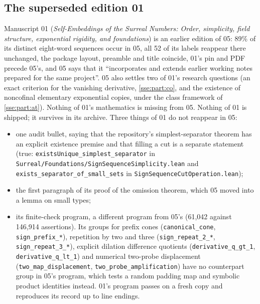 \documentclass[11pt,a4paper]{article}
\numberwithin{equation}{section}
\theoremstyle{plain}
\theoremstyle{definition}
\theoremstyle{remark}
\newcommand{\code}[1]{\texttt{\small #1}}
\newcommand{\fn}[1]{\nolinkurl{#1}}%
\begin{document}
\subsection{The superseded edition 01}
Manuscript 01 (\emph{Self-Embeddings of the Surreal Numbers: Order,
simplicity, field structure, exponential rigidity, and foundations}) is an
earlier edition of 05: 89\% of its distinct eight-word sequences occur in
05, all 52 of its labels reappear there unchanged, the package layout,
preamble and title coincide, 01's pin and PDF precede 05's, and 05 says that
it ``incorporates and extends earlier working notes prepared for the same
project''. 05 also settles two of 01's research questions (an exact
criterion for the vanishing derivative, \cref{sse:part:co}, and the
existence of noncofinal elementary exponential copies, under the class
framework of \cref{sse:part:at}). Nothing of 01's mathematics is missing from
05. Nothing of 01 is shipped; it survives in its archive. Three things of
01 do not reappear in 05:
\begin{itemize}
\item one audit bullet, saying that the repository's simplest-separator
theorem has an explicit existence premise and that filling a cut is a
separate statement (true: \fn{existsUnique_simplest_separator} in
\fn{Surreal/Foundations/SignSequenceSimplicity.lean} and
\fn{exists_separator_of_small_sets} in
\fn{SignSequenceCutOperation.lean});
\item the first paragraph of its proof of the omission theorem, which 05
moved into a lemma on small types;
\item its finite-check program, a different program from 05's
(61,042 against 146,914 assertions). Its groups for prefix cones
(\code{canonical\_cone}, \code{sign\_prefix\_*}), repetition by two and three
(\code{sign\_repeat\_2\_*}, \code{sign\_repeat\_3\_*}), explicit dilation
difference quotients (\code{derivative\_q\_gt\_1}, \code{derivative\_q\_lt\_1})
and numerical two-probe displacement (\code{two\_map\_displacement},
\code{two\_probe\_amplification}) have no counterpart group in 05's program,
which tests a random padding map and symbolic product identities instead.
01's program passes on a fresh copy and reproduces its record up to line
endings.
\end{itemize}
\end{document}
